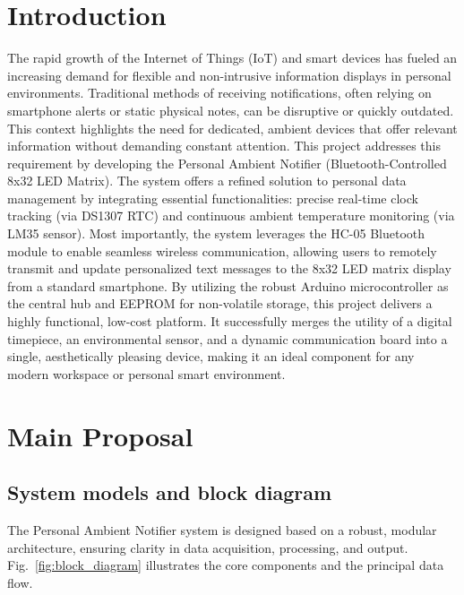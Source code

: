 \documentclass[a4paper, 10pt]{article}
\begin{document}
	\section{Introduction}
	The rapid growth of the Internet of Things (IoT) and smart devices has fueled an increasing demand for flexible and non-intrusive information displays in personal environments. Traditional methods of receiving notifications, often relying on smartphone alerts or static physical notes, can be disruptive or quickly outdated. This context highlights the need for dedicated, ambient devices that offer relevant information without demanding constant attention.
	This project addresses this requirement by developing the Personal Ambient Notifier (Bluetooth-Controlled 8x32 LED Matrix). The system offers a refined solution to personal data management by integrating essential functionalities: precise real-time clock tracking (via DS1307 RTC) and continuous ambient temperature monitoring (via LM35 sensor). Most importantly, the system leverages the HC-05 Bluetooth module to enable seamless wireless communication, allowing users to remotely transmit and update personalized text messages to the 8x32 LED matrix display from a standard smartphone.
	By utilizing the robust Arduino microcontroller as the central hub and EEPROM for non-volatile storage, this project delivers a highly functional, low-cost platform. It successfully merges the utility of a digital timepiece, an environmental sensor, and a dynamic communication board into a single, aesthetically pleasing device, making it an ideal component for any modern workspace or personal smart environment.
	
	\section{Main Proposal}
	
	\subsection{System models and block diagram}
	The Personal Ambient Notifier system is designed based on a robust, modular architecture, ensuring clarity in data acquisition, processing, and output. Fig.~\ref{fig:block_diagram} illustrates the core components and the principal data flow.
	
\end{document}
